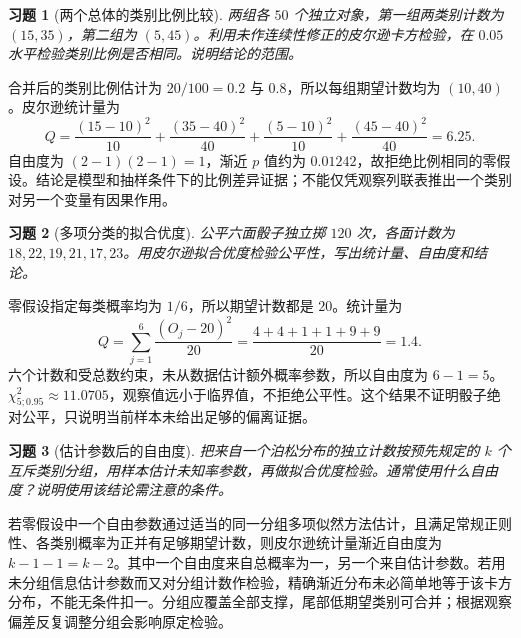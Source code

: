 \documentclass[UTF8,12pt,a4paper,fontset=fandol]{ctexart}
\newtheorem{exercise}{习题}[section]
\begin{document}
\begin{exercise}[两个总体的类别比例比较]\label{q:M-E2-II5}
两组各 $50$ 个独立对象，第一组两类别计数为 $(15,35)$，第二组为 $(5,45)$。利用未作连续性修正的皮尔逊卡方检验，在 $0.05$ 水平检验类别比例是否相同。说明结论的范围。\par{}
\end{exercise}

\begin{solve}\label{a:M-E2-II5}合并后的类别比例估计为 $20/100=0.2$ 与 $0.8$，所以每组期望计数均为 $(10,40)$。皮尔逊统计量为\[Q=\frac{(15-10)^2}{10}+\frac{(35-40)^2}{40}+\frac{(5-10)^2}{10}+\frac{(45-40)^2}{40}=6.25.\]自由度为 $(2-1)(2-1)=1$，渐近 $p$ 值约为 $0.01242$，故拒绝比例相同的零假设。结论是模型和抽样条件下的比例差异证据；不能仅凭观察列联表推出一个类别对另一个变量有因果作用。\end{solve}

\begin{exercise}[多项分类的拟合优度]\label{q:B15.1}
公平六面骰子独立掷 $120$ 次，各面计数为 $18,22,19,21,17,23$。用皮尔逊拟合优度检验公平性，写出统计量、自由度和结论。\par{}
\end{exercise}

\begin{solve}\label{a:B15.1}零假设指定每类概率均为 $1/6$，所以期望计数都是 $20$。统计量为\[Q=\sum_{j=1}^6\frac{(O_j-20)^2}{20}=\frac{4+4+1+1+9+9}{20}=1.4.\]六个计数和受总数约束，未从数据估计额外概率参数，所以自由度为 $6-1=5$。$\chi^2_{5;0.95}\approx11.0705$，观察值远小于临界值，不拒绝公平性。这个结果不证明骰子绝对公平，只说明当前样本未给出足够的偏离证据。\end{solve}

\begin{exercise}[估计参数后的自由度]\label{q:B15.2}
把来自一个泊松分布的独立计数按预先规定的 $k$ 个互斥类别分组，用样本估计未知率参数，再做拟合优度检验。通常使用什么自由度？说明使用该结论需注意的条件。\par{}
\end{exercise}

\begin{solve}\label{a:B15.2}若零假设中一个自由参数通过适当的同一分组多项似然方法估计，且满足常规正则性、各类别概率为正并有足够期望计数，则皮尔逊统计量渐近自由度为 $k-1-1=k-2$。其中一个自由度来自总概率为一，另一个来自估计参数。若用未分组信息估计参数而又对分组计数作检验，精确渐近分布未必简单地等于该卡方分布，不能无条件扣一。分组应覆盖全部支撑，尾部低期望类别可合并；根据观察偏差反复调整分组会影响原定检验。\end{solve}
\end{document}
